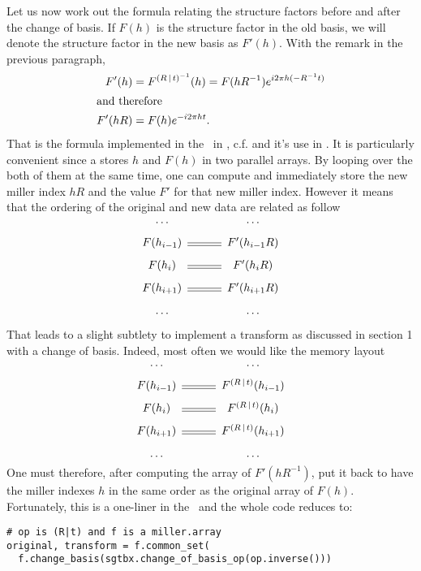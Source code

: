 \documentclass[11pt]{article}
\begin{document}
Let us now work out the formula relating the structure factors before and after the change of basis. If $F(h)$ is the structure factor in the old basis, we will denote the structure factor in the new basis as $F'(h)$. With the remark in the previous paragraph,
\begin{align}
F'(h) &= F^{\left( R\,\vert\, t \right)^{-1}}(h) = F(hR^{-1}) e^{i2\pi h(-R^{-1}t)}\nonumber\\
\intertext{and therefore}
F'(hR) &= F(h)e^{-i2\pi ht}. \label{eqn:change::basis::F}
\end{align}
That is the formula implemented in the \cctbx\ in , c.f.  and it's use in . It is particularly convenient since a  stores $h$ and $F(h)$ in two parallel arrays. By looping over the both of them at the same time, one can compute and immediately store the new miller index $hR$ and the value $F'$ for that new miller index. However it means that the ordering of the original and new data are related as follow
\begin{equation}
\begin{CD}
\ldots @. \ldots\\
F(h_{i-1}) @= F'(h_{i-1}R)\\
F(h_i) @= F'(h_iR)\\
F(h_{i+1}) @= F'(h_{i+1}R)\\
\ldots @. \ldots
\end{CD}
\label{eqn:miller::array::change::basis}
\end{equation}

That leads to a slight subtlety to implement a transform as discussed in section 1 with a change of basis. Indeed, most often we would like the memory layout
\begin{equation}
\begin{CD}
\ldots @. \ldots\\
F(h_{i-1}) @= F^{\sym{R}{t}}(h_{i-1})\\
F(h_i) @= F^{\sym{R}{t}}(h_i)\\
F(h_{i+1}) @= F^{\sym{R}{t}}(h_{i+1})\\
\ldots @. \ldots
\end{CD}
\label{eqn:miller::array::transform}
\end{equation}
One must therefore, after computing the array of $F'(hR^{-1})$, put it back to have the miller indexes $h$ in the same order as the original array of $F(h)$. Fortunately, this is a one-liner in the \cctbx\ and the whole code reduces to:
\begin{verbatim}
# op is (R|t) and f is a miller.array
original, transform = f.common_set(
  f.change_basis(sgtbx.change_of_basis_op(op.inverse()))
\end{verbatim}
\end{document}

